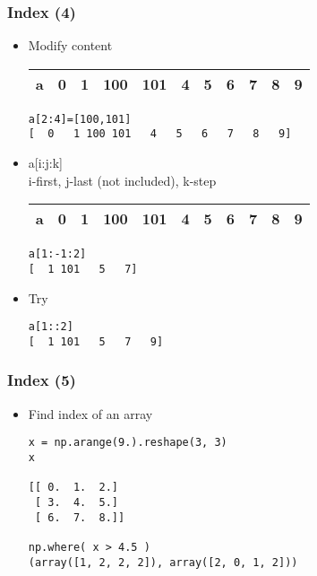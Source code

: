 \documentclass{beamer}
\begin{document}
\begin{frame}[fragile]
\frametitle{Index (4)}
\begin{itemize}
\item Modify content
\begin{table}[t]
\centering
\begin{tabular}{|l|c|c|c|c|c|c|c|c|c|c|}
\hline
a & 0 & 1 &\cellcolor{red} 100 &\cellcolor{red} 101 & 4 & 5 & 6 & 7 & 8 & 9 \\
\hline
\end{tabular}
\end{table}
\begin{lstlisting}
a[2:4]=[100,101]
[  0   1 100 101   4   5   6   7   8   9]
\end{lstlisting}

\item a[i:j:k] \\ 
i-first, j-last (not included), k-step
\begin{table}[t]
\centering
\begin{tabular}{|l|c|c|c|c|c|c|c|c|c|c|}
\hline
a & 0 &\cellcolor{red} 1 & 100 &\cellcolor{red} 101 & 4 &\cellcolor{red} 5 & 6 &\cellcolor{red} 7 & 8 & 9 \\
\hline
\end{tabular}
\end{table}

\begin{lstlisting}
a[1:-1:2]
[  1 101   5   7]
\end{lstlisting}
\item Try 
\begin{lstlisting}
a[1::2]
[  1 101   5   7   9]
\end{lstlisting}
\end{itemize}
\end{frame}

\begin{frame}[fragile]
\frametitle{Index (5)}
\begin{itemize}
\item Find index of an array
\begin{lstlisting}
x = np.arange(9.).reshape(3, 3)
x

[[ 0.  1.  2.]
 [ 3.  4.  5.]
 [ 6.  7.  8.]]

np.where( x > 4.5 )
(array([1, 2, 2, 2]), array([2, 0, 1, 2]))
\end{lstlisting}
\end{itemize}
\end{frame}
\end{document}
